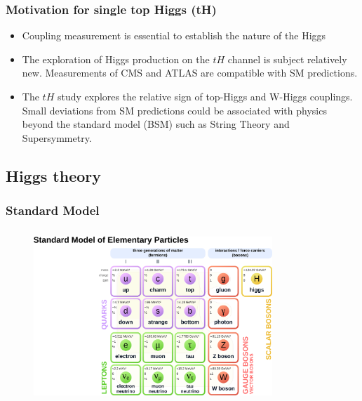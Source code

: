 \documentclass[11pt]{beamer}
\begin{document}
\begin{frame}
\frametitle{Motivation  for single top Higgs (tH)}
\begin{itemize}
\item Coupling measurement is essential to establish the nature of the Higgs
\item The exploration of Higgs production on the $tH$ channel is subject relatively new. Measurements of CMS and ATLAS are compatible with SM predictions.
\item The $tH$ study explores the relative sign of top-Higgs  and W-Higgs couplings.\\ Small deviations from SM predictions could be associated with physics beyond the
standard model (BSM) such as String Theory and  Supersymmetry.
\end{itemize}
\end{frame}

\begin{frame}
\section{Higgs theory}
\frametitle{Standard Model}
\begin{center}
\begin{figure}
	\includegraphics[width=9cm,height=6.5cm]{figures/sm1.png}
\end{figure}
\end{center}
\end{frame}
\end{document}
